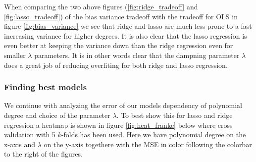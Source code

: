 \documentclass[12pt]{article}
\begin{document}
When comparing the two above figures (\ref{fig:ridge_tradeoff} and \ref{fig:lasso_tradeoff}) of the bias variance tradeoff with the tradeoff for OLS in figure \ref{fig:bias_variance} we see that ridge and lasso are much less prone to a fast increasing variance for higher degrees. It is also clear that the lasso regression is even better at keeping the variance down than the ridge regression even for smaller $\lambda$ parameters. It is in other words clear that the dampning parameter $\lambda$ does a great job of reducing overfiting for both ridge and lasso regression.

\subsubsection{Finding best models}
We continue with analyzing the error of our models dependency of polynomial degree and choice of the parameter $\lambda$. To best show this for lasso and ridge regression a heatmap is shown in figure \ref{fig:heat_franke} below where cross validation with 5 $k$-folds has been used. Here we have polynomial degree on the x-axis and $\lambda$ on the y-axis togethere with the MSE in color following the colorbar to the right of the figures.
\end{document}
